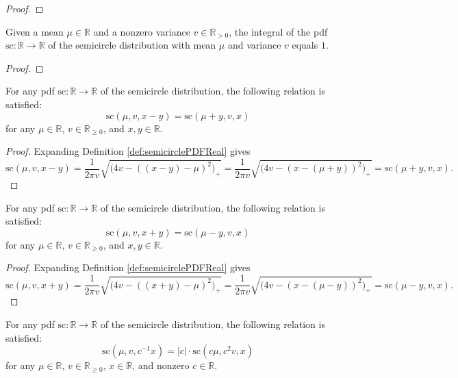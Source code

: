 \begin{proof}
\end{proof}
\begin{lemma}\label{lem:integral_semicirclePDFReal_eq_one}
    \notready
    Given a mean $\mu \in \mathbb{R}$ and a nonzero variance $v \in \mathbb{R}_{> 0}$, the integral of the pdf $\mathrm{sc} : \mathbb{R} \rightarrow \mathbb{R}$ 
    of the semicircle distribution with mean $\mu$ and variance $v$ equals $1$.
\end{lemma}
\begin{proof}
\end{proof}
\begin{lemma}\label{lem:semicirclePDFReal_sub}
    \mathlibok
    For any pdf $\mathrm{sc} : \mathbb{R} \rightarrow \mathbb{R}$ 
    of the semicircle distribution, the following relation is satisfied:
    \[
    \mathrm{sc}(\mu,v,x-y) = \mathrm{sc}(\mu+y,v,x)
    \]
    for any $\mu \in \mathbb{R}$, $v \in \mathbb{R}_{\geq 0}$, and $x,y \in \mathbb{R}$. 
\end{lemma}
\begin{proof}
   Expanding Definition \ref{def:semicirclePDFReal} gives
   \[
   \mathrm{sc}(\mu,v,x-y) 
   = \frac{1}{2πv} \sqrt{\bigl( 4v - ( (x - y) - μ)^2 \bigl)_+} 
   = \frac{1}{2πv} \sqrt{\bigl( 4v - (x - (μ + y))^2 \bigl)_+}
   = \mathrm{sc}(\mu+y,v,x).
   \]
\end{proof}
\begin{lemma}\label{lem:semicirclePDFReal_add}
    \mathlibok
    For any pdf $\mathrm{sc} : \mathbb{R} \rightarrow \mathbb{R}$ 
    of the semicircle distribution, the following relation is satisfied:
    \[
    \mathrm{sc}(\mu,v,x+y) = \mathrm{sc}(\mu-y,v,x)
    \]
    for any $\mu \in \mathbb{R}$, $v \in \mathbb{R}_{\geq 0}$, and $x,y \in \mathbb{R}$. 
\end{lemma}
\begin{proof}
   Expanding Definition \ref{def:semicirclePDFReal} gives
   \[
   \mathrm{sc}(\mu,v,x+y) 
   = \frac{1}{2πv} \sqrt{\bigl( 4v - ( (x + y) - μ)^2 \bigl)_+} 
   = \frac{1}{2πv} \sqrt{\bigl( 4v - (x - (μ - y))^2 \bigl)_+}
   = \mathrm{sc}(\mu-y,v,x).
   \]
\end{proof}
\begin{lemma}\label{lem:semicirclePDFReal_inv_mul}
    \notready
    For any pdf $\mathrm{sc} : \mathbb{R} \rightarrow \mathbb{R}$ 
    of the semicircle distribution, the following relation is satisfied:
    \[
    \mathrm{sc}(\mu,v,c^{-1} x) = |c| \cdot \mathrm{sc}(c \mu,c^2 v,x)
    \]
    for any $\mu \in \mathbb{R}$, $v \in \mathbb{R}_{\geq 0}$, $x \in \mathbb{R}$, and nonzero $c \in \mathbb{R}$. 
\end{lemma}
